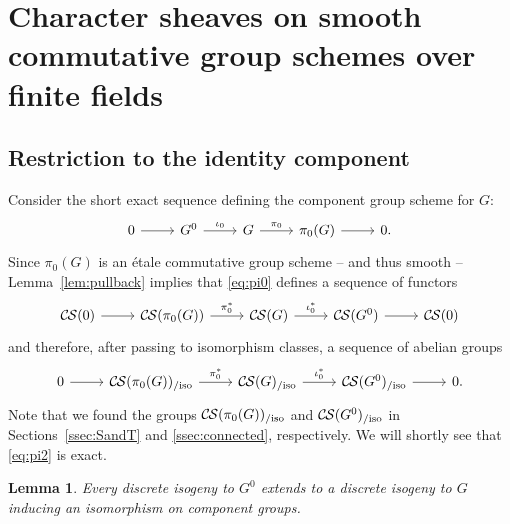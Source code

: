 \documentclass[10pt]{amsart}
\theoremstyle{plain}
\newtheorem{lemma}[theorem]{Lemma}
\theoremstyle{definition}
\newcommand{\CS}{{\mathcal{C\hskip-0.8pt S}}}
\newcommand{\CSiso}[1]{\CS(#1)_{/\text{iso}}}
\begin{document}
\section{Character sheaves on smooth commutative group schemes over finite fields}\label{sec:main}

\subsection{Restriction to the identity component} \label{ssec:restriction}

Consider the short exact sequence
defining the component group scheme for $G$:
\begin{equation}\label{eq:pi0}
\begin{tikzcd}
0 \rar & G^0 \arrow{r}{\iota_0} & G \arrow{r}{\pi_0} & \pi_0(G) \rar & 0.
\end{tikzcd}
\end{equation}
Since $\pi_0(G)$ is an \'etale commutative group scheme -- and thus smooth --
Lemma~\ref{lem:pullback} implies that \eqref{eq:pi0} defines a sequence of functors
\begin{equation}\label{eq:pi1}
\begin{tikzcd}
\CS(0) \rar & \CS(\pi_0(G)) \arrow{r}{\pi_0^*} & \CS(G) \arrow{r}{\iota_0^*} & \CS(G^0) \rar & \CS(0)
\end{tikzcd}
\end{equation}
and therefore, after passing to isomorphism classes, a sequence of abelian groups
\begin{equation}\label{eq:pi2}
\begin{tikzcd}
0 \rar &
\CSiso{\pi_0(G)} \arrow{r}{\pi_0^*} & \CSiso{G} \arrow{r}{\iota_0^*} & \CSiso{G^0} \rar & 0.
\end{tikzcd}
\end{equation}
 Note that we found the groups $\CSiso{\pi_0(G)}$ and $\CSiso{G^0}$
in Sections~\ref{ssec:SandT} and \ref{ssec:connected}, respectively.
We will shortly see that \eqref{eq:pi2} is exact.


\begin{lemma}\label{lemma:ext}
Every discrete isogeny to $G^0$ extends to a discrete
isogeny to $G$ inducing an isomorphism on component groups.
\end{lemma}
\end{document}
